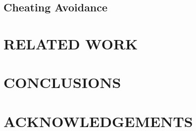 \documentclass{sigchi}
\begin{document}
\subsection{Cheating Avoidance}



\section{RELATED WORK}
\label{relatedwork}




\section{CONCLUSIONS}
\label{conclusions}




\section{ACKNOWLEDGEMENTS}




\balance


\end{document}
